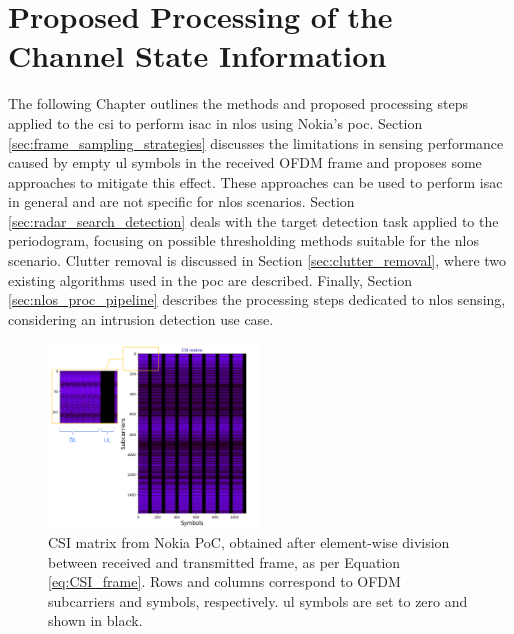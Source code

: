 \chapter{Proposed Processing of the Channel State Information }
\label{chap:TDD pattern of the OFDM frame}

The following Chapter outlines the methods and proposed processing steps applied to the \gls{csi} to perform \gls{isac} in \gls{nlos} using Nokia's \gls{poc}.
Section \ref{sec:frame_sampling_strategies} discusses the limitations in sensing performance caused by empty \gls{ul} symbols in the received OFDM frame and proposes some approaches to mitigate this effect.
These approaches can be used to perform \gls{isac} in general and are not specific for \gls{nlos} scenarios.
Section \ref{sec:radar_search_detection} deals with the target detection task applied to the periodogram, focusing on possible thresholding methods suitable for the \gls{nlos} scenario.
Clutter removal is discussed in Section \ref{sec:clutter_removal}, where two existing algorithms used in the \gls{poc} are described.
Finally, Section \ref{sec:nlos_proc_pipeline} describes the processing steps dedicated to \gls{nlos} sensing, considering an intrusion detection use case.
\begin{figure}[H]
	\centering
	\includegraphics[width=0.5\textwidth]{Images/TDDprocessing/CSIMatrix_DLULpattern.png}
	\caption{\small CSI matrix from Nokia PoC, obtained after element-wise division between received and transmitted frame, as per Equation \eqref{eq:CSI_frame}.
		Rows and columns correspond to OFDM subcarriers and symbols, respectively. \Gls{ul} symbols are set to zero and shown in black.}
	\label{fig:CSIMatrix_DLULpattern}
\end{figure}

